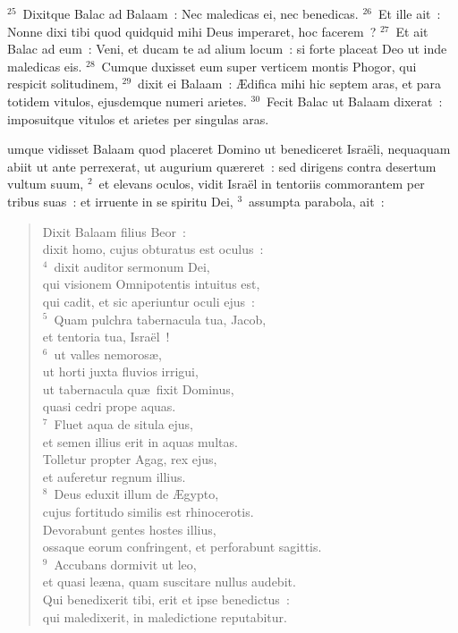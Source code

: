 ${}^{25}$~Dixitque Balac ad Balaam~: Nec maledicas ei, nec benedicas.
${}^{26}$~Et ille ait~: Nonne dixi tibi quod quidquid mihi Deus imperaret, hoc facerem~?
${}^{27}$~Et ait Balac ad eum~: Veni, et ducam te ad alium locum~: si forte placeat Deo ut inde maledicas eis.
${}^{28}$~Cumque duxisset eum super verticem montis Phogor, qui respicit solitudinem,
${}^{29}$~dixit ei Balaam~: \AE difica mihi hic septem aras, et para totidem vitulos, ejusdemque numeri arietes.
${}^{30}$~Fecit Balac ut Balaam dixerat~: imposuitque vitulos et arietes per singulas aras.

\bchapter
{}umque vidisset Balaam quod placeret Domino ut benediceret Isra\"eli, nequaquam abiit ut ante perrexerat, ut augurium qu\ae reret~: sed dirigens contra desertum vultum suum,
${}^{2}$~et elevans oculos, vidit Isra\"el in tentoriis commorantem per tribus suas~: et irruente in se spiritu Dei,
${}^{3}$~assumpta parabola, ait~: \begin{verse}Dixit Balaam filius Beor~:\\ dixit homo, cujus obturatus est oculus~:\\
${}^{4}$~dixit auditor sermonum Dei,\\ qui visionem Omnipotentis intuitus est,\\ qui cadit, et sic aperiuntur oculi ejus~:\\
${}^{5}$~Quam pulchra tabernacula tua, Jacob,\\ et tentoria tua, Isra\"el~!\\
${}^{6}$~ut valles nemoros\ae ,\\ ut horti juxta fluvios irrigui,\\ ut tabernacula qu\ae\ fixit Dominus,\\ quasi cedri prope aquas.\\
${}^{7}$~Fluet aqua de situla ejus,\\ et semen illius erit in aquas multas.\\ Tolletur propter Agag, rex ejus,\\ et auferetur regnum illius.\\
${}^{8}$~Deus eduxit illum de \AE gypto,\\ cujus fortitudo similis est rhinocerotis.\\ Devorabunt gentes hostes illius,\\ ossaque eorum confringent, et perforabunt sagittis.\\
${}^{9}$~Accubans dormivit ut leo,\\ et quasi le\ae na, quam suscitare nullus audebit.\\ Qui benedixerit tibi, erit et ipse benedictus~:\\ qui maledixerit, in maledictione reputabitur.\end{verse}


